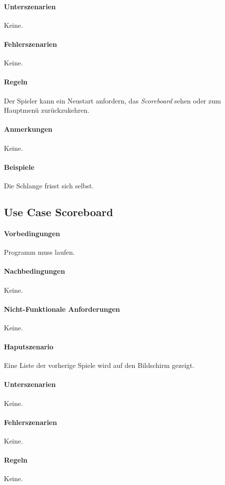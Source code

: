 \documentclass[a4paper, twosided, 11pt]{scrartcl}
\begin{document}
\paragraph{Unterszenarien} Keine.
\paragraph{Fehlerszenarien} Keine.
\paragraph{Regeln} Der Spieler kann ein Neustart anfordern, das
\emph{Scoreboard} sehen oder zum Hauptmenü zurückzukehren.
\paragraph{Anmerkungen} Keine.
\paragraph{Beispiele} Die Schlange frisst sich selbst.

\subsection{Use Case Scoreboard}
\paragraph{Vorbedingungen} Programm muss laufen.
\paragraph{Nachbedingungen} Keine.
\paragraph{Nicht-Funktionale Anforderungen} Keine.
\paragraph{Haputszenario} Eine Liste der vorherige Spiele wird auf den
Bildschirm gezeigt.
\paragraph{Unterszenarien} Keine.
\paragraph{Fehlerszenarien} Keine.
\paragraph{Regeln} Keine.
\end{document}
